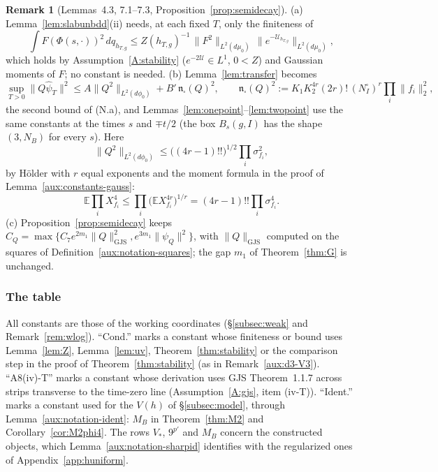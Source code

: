 \documentclass[11pt,a4paper]{article}
\theoremstyle{plain}
\theoremstyle{definition}
\theoremstyle{plain}
\theoremstyle{definition}
\newtheorem{auxrem}[auxlemma]{Remark}
\newcommand{\E}{\mathbb{E}}
\newcommand{\GJS}[1]{\lVert #1\rVert_{\mathrm{GJS}}}   %
\newcommand{\Uc}{\mathcal U}
\newcommand{\dmu}{d\mu_0}
\newcommand{\dphi}{d\phi_0}
\begin{document}
\begin{auxrem}[Lemmas~4.3, 7.1--7.3, Proposition~\ref{prop:semidecay}]\label{aux:constants-other}
(a) Lemma~\ref{lem:slabunbdd}(ii) needs, at each fixed $T$, only the finiteness of
\[
 \int F(\Phi(s,\cdot))^2\,dq_{h_{T,g}}\le Z(h_{T,g})^{-1}\,\|F^2\|_{L^2(\dmu)}\,
 \|e^{-\Uc_{h_{T,g}}}\|_{L^2(\dmu)},
\]
which holds by Assumption~\ref{A:stability} ($e^{-2\Uc}\in L^1$, $0<Z$) and Gaussian moments of $F$; no
constant is needed.  (b) Lemma~\ref{lem:transfer} becomes
\[
 \sup_{T>0}\|Q\hat\psi_T\|^2\le A\|Q^2\|_{L^2(\dphi)}+B'\,\mathfrak n_\square(Q)^2,\qquad
 \mathfrak n_\square(Q)^2:=K_1K_2^{4r}(2r)!\,(N^{\square}_I)^r\prod_i\|f_i\|_2^2 ,
\]
the second bound of (N.a), and Lemmas~\ref{lem:onepoint}--\ref{lem:twopoint} use the same constants at the times $s$ and $\mp t/2$ (the
box $B_s(g,I)$ has the shape $(3,N_B)$ for every $s$).  Here
\[
 \|Q^2\|_{L^2(\dphi)}\le\bigl((4r-1)!!\bigr)^{1/2}\prod_i\sigma_{f_i}^2 ,
\]
by H\"older with $r$ equal exponents and the moment formula in the proof of
Lemma~\ref{aux:constants-gauss}:
\[
 \E\prod_iX_{f_i}^4\le\prod_i\bigl(\E X_{f_i}^{4r}\bigr)^{1/r}=(4r-1)!!\prod_i\sigma_{f_i}^4 .
\]
(c) Proposition~\ref{prop:semidecay} keeps
$\widehat C_Q=\max\{C_7e^{2m_1}\GJS Q^2,e^{3m_1}\|\psi_Q\|^2\}$, with $\GJS Q$ computed on the
squares of Definition~\ref{aux:notation-squares}; the gap $m_1$ of Theorem~\ref{thm:G} is unchanged.
\end{auxrem}

\subsubsection*{The table}

All constants are those of the working coordinates (\S\ref{subsec:weak} and Remark~\ref{rem:wlog}).  ``Cond.'' marks a constant whose finiteness or bound uses Lemma~\ref{lem:Z},
Lemma~\ref{lem:uv}, Theorem~\ref{thm:stability} or the comparison step in the proof of
Theorem~\ref{thm:stability} (as in Remark~\ref{aux:d3-V3}).  ``A8(iv)-T'' marks a constant whose
derivation uses GJS Theorem~1.1.7 across strips transverse to the time-zero line
(Assumption~\ref{A:gjs}, item (iv-T)).  ``Ident.'' marks a constant used for the $V(h)$ of
\S\ref{subsec:model}, through Lemma~\ref{aux:notation-ident}: $M_B$ in Theorem~\ref{thm:M2} and
Corollary~\ref{cor:M2phi4}.  The rows $V_*$, $9^{p'}$ and $M_B$ concern the constructed
objects, which Lemma~\ref{aux:notation-sharpid} identifies with the regularized ones of
Appendix~\ref{app:huniform}.
\end{document}
